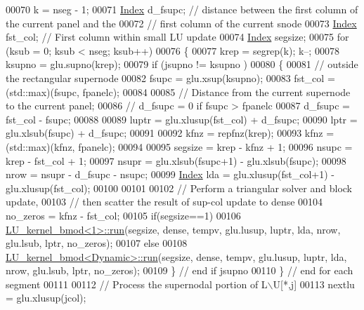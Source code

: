 \begin{DoxyCode}
00070   k = nseg - 1; 
00071   \hyperlink{namespace_eigen_a62e77e0933482dafde8fe197d9a2cfde}{Index} d\_fsupc; \textcolor{comment}{// distance between the first column of the current panel and the }
00072                \textcolor{comment}{// first column of the current snode}
00073   \hyperlink{namespace_eigen_a62e77e0933482dafde8fe197d9a2cfde}{Index} fst\_col; \textcolor{comment}{// First column within small LU update}
00074   \hyperlink{namespace_eigen_a62e77e0933482dafde8fe197d9a2cfde}{Index} segsize; 
00075   \textcolor{keywordflow}{for} (ksub = 0; ksub < nseg; ksub++)
00076   \{
00077     krep = segrep(k); k--; 
00078     ksupno = glu.supno(krep); 
00079     \textcolor{keywordflow}{if} (jsupno != ksupno )
00080     \{
00081       \textcolor{comment}{// outside the rectangular supernode }
00082       fsupc = glu.xsup(ksupno); 
00083       fst\_col = (std::max)(fsupc, fpanelc); 
00084       
00085       \textcolor{comment}{// Distance from the current supernode to the current panel; }
00086       \textcolor{comment}{// d\_fsupc = 0 if fsupc > fpanelc}
00087       d\_fsupc = fst\_col - fsupc; 
00088       
00089       luptr = glu.xlusup(fst\_col) + d\_fsupc; 
00090       lptr = glu.xlsub(fsupc) + d\_fsupc; 
00091       
00092       kfnz = repfnz(krep); 
00093       kfnz = (std::max)(kfnz, fpanelc); 
00094       
00095       segsize = krep - kfnz + 1; 
00096       nsupc = krep - fst\_col + 1; 
00097       nsupr = glu.xlsub(fsupc+1) - glu.xlsub(fsupc); 
00098       nrow = nsupr - d\_fsupc - nsupc;
00099       \hyperlink{namespace_eigen_a62e77e0933482dafde8fe197d9a2cfde}{Index} lda = glu.xlusup(fst\_col+1) - glu.xlusup(fst\_col);
00100       
00101       
00102       \textcolor{comment}{// Perform a triangular solver and block update, }
00103       \textcolor{comment}{// then scatter the result of sup-col update to dense}
00104       no\_zeros = kfnz - fst\_col; 
00105       \textcolor{keywordflow}{if}(segsize==1)
00106         \hyperlink{struct_eigen_1_1internal_1_1_l_u__kernel__bmod}{LU\_kernel\_bmod<1>::run}(segsize, dense, tempv, glu.lusup, luptr, lda, nrow, 
      glu.lsub, lptr, no\_zeros);
00107       \textcolor{keywordflow}{else}
00108         \hyperlink{struct_eigen_1_1internal_1_1_l_u__kernel__bmod}{LU\_kernel\_bmod<Dynamic>::run}(segsize, dense, tempv, glu.lusup, luptr, 
      lda, nrow, glu.lsub, lptr, no\_zeros);
00109     \} \textcolor{comment}{// end if jsupno }
00110   \} \textcolor{comment}{// end for each segment}
00111   
00112   \textcolor{comment}{// Process the supernodal portion of  L\(\backslash\)U[*,j]}
00113   nextlu = glu.xlusup(jcol); 

\end{DoxyCode}
